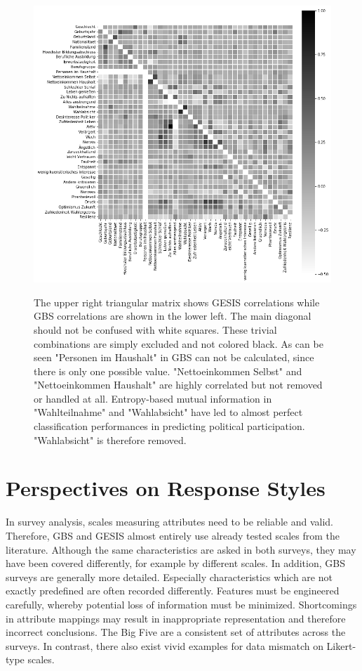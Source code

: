 \begin{figure}[ht]
	\begin{center}
		\captionsetup{width= 400pt}
		\includegraphics[scale=0.73,angle=0]{fig/correl}
		\label{corr}
		\caption{The upper right triangular matrix shows GESIS correlations while GBS correlations are shown in the lower left. The main diagonal should not be confused with white squares. These trivial combinations are simply excluded and not colored black. As can be seen "Personen im Haushalt" in GBS can not be calculated, since there is only one possible value. "Nettoeinkommen Selbst" and "Nettoeinkommen Haushalt" are highly correlated but not removed or handled at all. Entropy-based mutual information in "Wahlteilnahme" and "Wahlabsicht" have led to almost perfect classification performances in predicting political participation. "Wahlabsicht" is therefore removed.}
	\end{center}
\end{figure}

\section{Perspectives on Response Styles}

In survey analysis, scales measuring attributes need to be reliable and valid. Therefore, GBS and GESIS almost entirely use already tested scales from the literature. Although the same characteristics are asked in both surveys, they may have been covered differently, for example by different scales. In addition, GBS surveys are generally more detailed. Especially characteristics which are not exactly predefined are often recorded differently. Features must be engineered carefully, whereby potential loss of information must be minimized. Shortcomings in attribute mappings may result in inappropriate representation and therefore incorrect conclusions. The Big Five are a consistent set of attributes across the surveys. In contrast, there also exist vivid examples for data mismatch on Likert-type scales.

